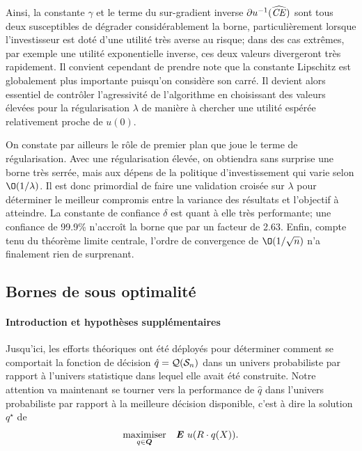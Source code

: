 Ainsi, la constante $\gamma$ et le terme du sur-gradient inverse $\partial u^{-1}(\nhCE)$ sont tous
deux susceptibles de dégrader considérablement la borne, particulièrement lorsque
l'investisseur est doté d'une utilité très averse au risque; dans des cas extrêmes, par
exemple une utilité exponentielle inverse, ces deux valeurs divergeront très
rapidement. Il convient cependant de prendre note que la constante Lipschitz est
globalement plus importante puisqu'on considère son carré. Il devient alors essentiel de
contrôler l'agressivité de l'algorithme en choisissant des valeurs élevées pour la
régularisation $\lambda$ de manière à chercher une utilité espérée relativement proche de
$u(0)$.

On constate par ailleurs le rôle de premier plan que joue le terme de régularisation. Avec
une régularisation élevée, on obtiendra sans surprise une borne très serrée, mais aux
dépens de la politique d'investissement qui varie selon $\O(1/\lambda)$. Il est donc primordial
de faire une validation croisée sur $\lambda$ pour déterminer le meilleur compromis entre la
variance des résultats et l'objectif à atteindre. La constante de confiance $\delta$ est quant
à elle très performante; une confiance de \num{99.9}\% n'accroît la borne que par un
facteur de \num{2.63}. Enfin, compte tenu du théorème limite centrale, l'ordre de
convergence de $\O(1/\sqrt{n})$ n'a finalement rien de surprenant.




\subsection{Bornes de sous optimalité}
\label{b:sopt}


\paragraph{Introduction et hypothèses supplémentaires}

Jusqu'ici, les efforts théoriques ont été déployés pour déterminer comment se comportait
la fonction de décision $\hat q = \alg(\S_n)$ dans un univers probabiliste par rapport à
l'univers statistique dans lequel elle avait été construite. Notre attention va maintenant
se tourner vers la performance de $\hat q$ dans l'univers probabiliste par rapport à la
meilleure décision disponible, c'est à dire la solution $q^\star$ de 
\begin{equation}
  \maximizeEquation[q \in \Q]{\E\,u(R \cdot q(X)).}
\end{equation}

